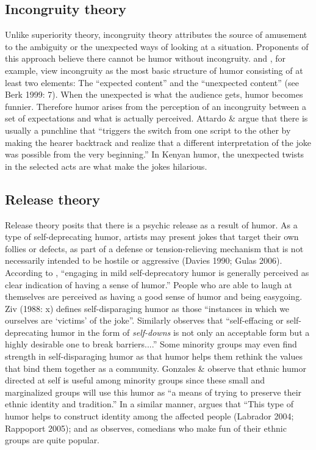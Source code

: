 \documentclass[output=paper]{langsci/langscibook}
\begin{document}
\subsection{Incongruity theory}

   Unlike superiority theory, incongruity theory attributes the source of amusement to the ambiguity or the unexpected ways of looking at a situation. Proponents of this approach believe there cannot be humor without incongruity. \citet{Berk1999} and \citet{Caroll2014}, for example, view incongruity as the most basic structure of humor consisting of at least two elements: The “expected content” and the “unexpected content” (see Berk 1999: 7). When the unexpected is what the audience gets, humor becomes funnier. Therefore humor arises from the perception of an incongruity between a set of expectations and what is actually perceived. Attardo \& \citet[308]{Raskin1999} argue that there is usually a punchline that “triggers the switch from one script to the other by making the hearer backtrack and realize that a different interpretation of the joke was possible from the very beginning.” In Kenyan humor, the unexpected twists in the selected acts are what make the jokes hilarious. 

\subsection{Release theory}

   Release theory posits that there is a psychic release as a result of humor. As a type of self-deprecating humor, artists may present jokes that target their own follies or defects, as part of a defense or tension-relieving mechanism that is not necessarily intended to be hostile or aggressive (Davies 1990; Gulas 2006). According to \citet[30]{Apte1987}, “engaging in mild self-deprecatory humor is generally perceived as clear indication of having a sense of humor.” People who are able to laugh at themselves are perceived as having a good sense of humor and being easygoing. Ziv (1988: x) defines self-disparaging humor as those “instances in which we ourselves are ‘victims’ of the joke”. Similarly \citet[12]{Berk1999} observes that “self-effacing or self-deprecating humor in the form of \textit{self-downs} is not only an acceptable form but a highly desirable one to break barriers....” Some minority groups may even find strength in self-disparaging humor as that humor helps them rethink the values that bind them together as a community. Gonzales \& \citet[172]{Wiseman2005} observe that ethnic humor directed at self is useful among minority groups since these small and marginalized groups will use this humor as “a means of trying to preserve their ethnic identity and tradition.” In a similar manner, \citet[298]{Labrador2004} argues that “This type of humor helps to construct identity among the affected people (Labrador 2004; Rappoport 2005); and as \citet[36]{Apte1987} observes, comedians who make fun of their ethnic groups are quite popular. 
\end{document}
